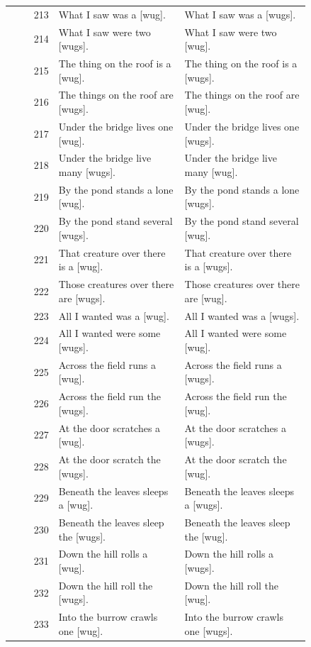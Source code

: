 \begin{table}[p]
\begin{tabular}{@{}rp{0.42\linewidth}p{0.42\linewidth}@{}}
213 & What I saw was a {[}wug{]}. & What I saw was a {[}wugs{]}. \\
214 & What I saw were two {[}wugs{]}. & What I saw were two {[}wug{]}. \\
215 & The thing on the roof is a {[}wug{]}. & The thing on the roof is a {[}wugs{]}. \\
216 & The things on the roof are {[}wugs{]}. & The things on the roof are {[}wug{]}. \\
217 & Under the bridge lives one {[}wug{]}. & Under the bridge lives one {[}wugs{]}. \\
218 & Under the bridge live many {[}wugs{]}. & Under the bridge live many {[}wug{]}. \\
219 & By the pond stands a lone {[}wug{]}. & By the pond stands a lone {[}wugs{]}. \\
220 & By the pond stand several {[}wugs{]}. & By the pond stand several {[}wug{]}. \\
221 & That creature over there is a {[}wug{]}. & That creature over there is a {[}wugs{]}. \\
222 & Those creatures over there are {[}wugs{]}. & Those creatures over there are {[}wug{]}. \\
223 & All I wanted was a {[}wug{]}. & All I wanted was a {[}wugs{]}. \\
224 & All I wanted were some {[}wugs{]}. & All I wanted were some {[}wug{]}. \\
225 & Across the field runs a {[}wug{]}. & Across the field runs a {[}wugs{]}. \\
226 & Across the field run the {[}wugs{]}. & Across the field run the {[}wug{]}. \\
227 & At the door scratches a {[}wug{]}. & At the door scratches a {[}wugs{]}. \\
228 & At the door scratch the {[}wugs{]}. & At the door scratch the {[}wug{]}. \\
229 & Beneath the leaves sleeps a {[}wug{]}. & Beneath the leaves sleeps a {[}wugs{]}. \\
230 & Beneath the leaves sleep the {[}wugs{]}. & Beneath the leaves sleep the {[}wug{]}. \\
231 & Down the hill rolls a {[}wug{]}. & Down the hill rolls a {[}wugs{]}. \\
232 & Down the hill roll the {[}wugs{]}. & Down the hill roll the {[}wug{]}. \\
233 & Into the burrow crawls one {[}wug{]}. & Into the burrow crawls one {[}wugs{]}. \\

\end{tabular}
\end{table}
